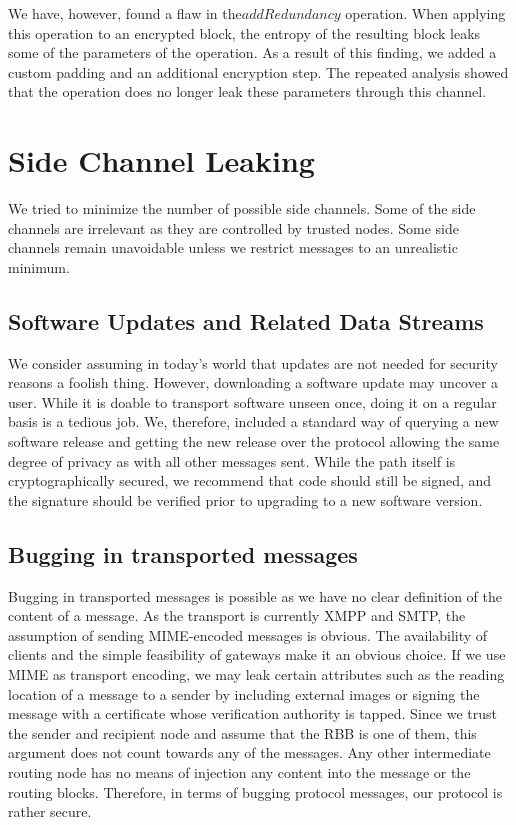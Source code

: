 We have, however, found a flaw in the$addRedundancy$ operation. When applying this operation to an encrypted block, the entropy of the resulting block leaks some of the parameters of the operation. As a result of this finding, we added a custom padding and an additional encryption step. The repeated analysis showed that the operation does no longer leak these parameters through this channel.

\section{Side Channel Leaking}
We tried to minimize the number of possible side channels. Some of the side channels are irrelevant as they are controlled by trusted nodes. Some side channels remain unavoidable unless we restrict messages to an unrealistic minimum. 

\subsection{Software Updates and Related Data Streams}
We consider assuming in today's world that updates are not needed for security reasons a foolish thing. However, downloading a software update may uncover a user. While it is doable to transport software unseen once, doing it on a regular basis is a tedious job. We, therefore, included a standard way of querying a new software release and getting the new release over the \MessageVortex{} protocol allowing the same degree of privacy as with all other messages sent. While the path itself is cryptographically secured, we recommend that code should still be signed, and the signature should be verified prior to upgrading to a new software version.

\subsection{Bugging in transported messages}
Bugging in transported messages is possible as we have no clear definition of the content of a message. As the transport is currently XMPP and SMTP, the assumption of sending MIME-encoded messages is obvious. The availability of clients and the simple feasibility of gateways make it an obvious choice. If we use MIME as transport encoding, we may leak certain attributes such as the reading location of a message to a sender by including external images or signing the message with a certificate whose verification authority is tapped. Since we trust the sender and recipient node and assume that the RBB is one of them, this argument does not count towards any of the messages. Any other intermediate routing node has no means of injection any content into the message or the routing blocks. Therefore, in terms of bugging protocol messages, our protocol is rather secure.

